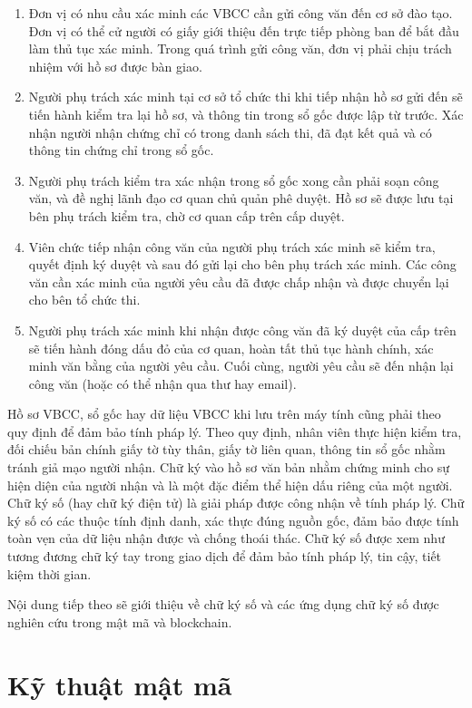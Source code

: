 \begin{enumerate}
\item Đơn vị có nhu cầu xác minh các VBCC cần gửi công văn đến cơ sở đào tạo. Đơn vị có thể cử người có giấy giới thiệu đến trực tiếp phòng ban để bắt đầu làm thủ tục xác minh. Trong quá trình gửi công văn, đơn vị phải chịu trách nhiệm với hồ sơ được bàn giao.
\item Người phụ trách xác minh tại cơ sở tổ chức thi khi tiếp nhận hồ sơ gửi đến sẽ tiến hành kiểm tra lại hồ sơ, và thông tin trong sổ gốc được lập từ trước. Xác nhận người nhận chứng chỉ có trong danh sách thi, đã đạt kết quả và có thông tin chứng chỉ trong sổ gốc.
\item Người phụ trách kiểm tra xác nhận trong sổ gốc xong cần phải soạn công văn, và đề nghị lãnh đạo cơ quan chủ quản phê duyệt. Hồ sơ sẽ được lưu tại bên phụ trách kiểm tra, chờ cơ quan cấp trên cấp duyệt.
\item Viên chức tiếp nhận công văn của người phụ trách xác minh sẽ kiểm tra, quyết định ký duyệt và sau đó gửi lại cho bên phụ trách xác minh. Các công văn cần xác minh của người yêu cầu đã được chấp nhận và được chuyển lại cho bên tổ chức thi.
\item Người phụ trách xác minh khi nhận được công văn đã ký duyệt của cấp trên sẽ tiến hành đóng dấu đỏ của cơ quan, hoàn tất thủ tục hành chính, xác minh văn bằng của người yêu cầu. Cuối cùng, người yêu cầu sẽ đến nhận lại công văn (hoặc có thể nhận qua thư hay email).
\end{enumerate}

Hồ sơ VBCC, sổ gốc hay dữ liệu VBCC khi lưu trên máy tính cũng phải theo quy định để đảm bảo tính pháp lý.
Theo quy định, nhân viên thực hiện kiểm tra, đối chiếu bản chính giấy tờ tùy thân, giấy tờ liên quan, thông tin sổ gốc nhằm tránh giả mạo người nhận.
Chữ ký vào hồ sơ văn bản nhằm chứng minh cho sự hiện diện của người nhận và là một đặc điểm thể hiện dấu riêng của một người.
Chữ ký số (hay chữ ký điện tử) là giải pháp được công nhận về tính pháp lý. Chữ ký số có các thuộc tính định danh, xác thực đúng nguồn gốc, đảm bảo được tính toàn vẹn của dữ liệu nhận được và chống thoái thác. Chữ ký số được xem như tương đương chữ ký tay trong giao dịch để đảm bảo tính pháp lý, tin cậy, tiết kiệm thời gian.

Nội dung tiếp theo sẽ giới thiệu về chữ ký số và các ứng dụng chữ ký số được nghiên cứu trong mật mã và blockchain.

\section{Kỹ thuật mật mã}

